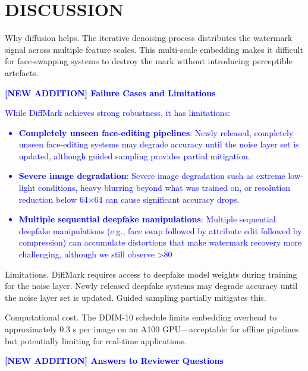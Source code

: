 \documentclass{article}
\begin{document}
\section{DISCUSSION}
Why diffusion helps. The iterative denoising process distributes the watermark signal across multiple feature scales. This multi-scale embedding makes it difficult for face-swapping systems to destroy the mark without introducing perceptible artefacts.

\vspace{1em}
\textcolor{blue}{\textbf{[NEW ADDITION] Failure Cases and Limitations}}

\textcolor{blue}{
While DiffMark achieves strong robustness, it has limitations:
\begin{itemize}
\item \textbf{Completely unseen face-editing pipelines}: Newly released, completely unseen face-editing systems may degrade accuracy until the noise layer set is updated, although guided sampling provides partial mitigation.
\item \textbf{Severe image degradation}: Severe image degradation such as extreme low-light conditions, heavy blurring beyond what was trained on, or resolution reduction below 64×64 can cause significant accuracy drops.
\item \textbf{Multiple sequential deepfake manipulations}: Multiple sequential deepfake manipulations (e.g., face swap followed by attribute edit followed by compression) can accumulate distortions that make watermark recovery more challenging, although we still observe >80%
\end{itemize}
}

Limitations. DiffMark requires access to deepfake model weights during training for the noise layer. Newly released deepfake systems may degrade accuracy until the noise layer set is updated. Guided sampling partially mitigates this.

Computational cost. The DDIM-10 schedule limits embedding overhead to approximately 0.3 s per image on an A100 GPU—acceptable for offline pipelines but potentially limiting for real-time applications.

\vspace{1em}
\textcolor{blue}{\textbf{[NEW ADDITION] Answers to Reviewer Questions}}
\end{document}
